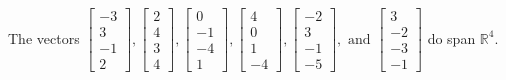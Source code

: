 \begin{exercise}
\begin{exerciseStatement}
  \end{exerciseStatement}
  \begin{exerciseAnswer}
   The vectors \(\left[\begin{array}{r}
-3 \\
3 \\
-1 \\
2
\end{array}\right] , \left[\begin{array}{r}
2 \\
4 \\
3 \\
4
\end{array}\right] , \left[\begin{array}{r}
0 \\
-1 \\
-4 \\
1
\end{array}\right] , \left[\begin{array}{r}
4 \\
0 \\
1 \\
-4
\end{array}\right] , \left[\begin{array}{r}
-2 \\
3 \\
-1 \\
-5
\end{array}\right] , \text{ and } \left[\begin{array}{r}
3 \\
-2 \\
-3 \\
-1
\end{array}\right]\) 
  	 do  
	span \(\mathbb{R}^4\).
  


  \end{exerciseAnswer}
\end{exercise}